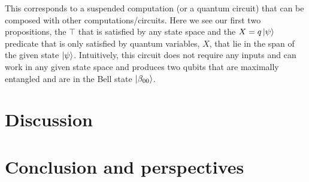 \documentclass[adraft,creativecommons]{eptcs}
\begin{document}


This corresponds to a suspended computation (or a quantum circuit) that can be composed with other computations/circuits. Here we see our first two propositions, the $\top$ that is satisfied by any state space and the $X =q \ket{\psi}$ predicate that is only satisfied by quantum variables, $X$, that lie in the span of the given state $\ket{\psi}$. Intuitively, this circuit does not require any inputs and can work in any given state space and produces two qubits that are maximally entangled and are in the Bell state $\ket{\beta_{00}}$.

\section{Discussion}

\section{Conclusion and perspectives}


\end{document}
